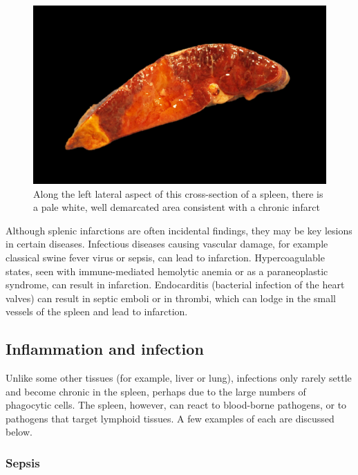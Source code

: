 \documentclass[openany]{article}
\begin{document}
\begin{figure}

{\centering \includegraphics[width=1\linewidth]{images/spleen-infarct-3-black} 

}

\caption{Along the left lateral aspect of this cross-section of a spleen, there is a pale white, well demarcated area consistent with a chronic infarct}\label{fig:spleen-infarct}
\end{figure}

Although splenic infarctions are often incidental findings, they may be
key lesions in certain diseases. Infectious diseases causing vascular
damage, for example classical swine fever virus or sepsis, can lead to
infarction. Hypercoagulable states, seen with immune-mediated hemolytic
anemia or as a paraneoplastic syndrome, can result in infarction.
Endocarditis (bacterial infection of the heart valves) can result in
septic emboli or in thrombi, which can lodge in the small vessels of the
spleen and lead to infarction.

\subsection{Inflammation and
infection}\label{inflammation-and-infection}

Unlike some other tissues (for example, liver or lung), infections only
rarely settle and become chronic in the spleen, perhaps due to the large
numbers of phagocytic cells. The spleen, however, can react to
blood-borne pathogens, or to pathogens that target lymphoid tissues. A
few examples of each are discussed below.

\subsubsection{Sepsis}\label{sepsis}
\end{document}
